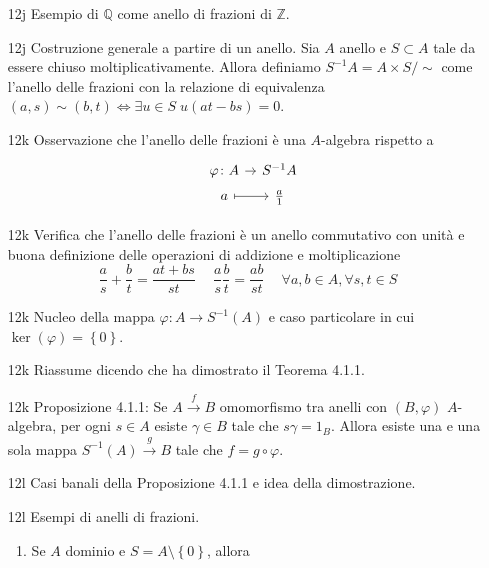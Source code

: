 \documentclass[italian]{article}
\begin{document}
	\begin{enumerate}
      \item[12j] Esempio di $\mathbb{Q}$ come anello di frazioni di
        $\mathbb{Z}$. 
      \item[12j] Costruzione generale a partire di un anello. Sia $A$ anello
        e $S\subset A$ tale da essere chiuso moltiplicativamente. Allora
        definiamo $S^{-1} A = A \times S / \sim$ come l'anello delle frazioni
        con la relazione di equivalenza $(a,s) \sim (b,t) \iff \exists u \in S\;
        u(at - bs) = 0$. 
      \item[12k] Osservazione che l'anello delle frazioni è una $A$-algebra
        rispetto a 
        \begin{equation*}
        	\begin{tikzcd}[row sep=0.2em, column sep = 0.8em]
        		&\varphi \colon A \arrow{r}  & S^{-1}A \\
         		&		a \arrow[r, mapsto] & \frac{a}{1}	
        	\end{tikzcd}
        \end{equation*}
      \item[12k] Verifica che l'anello delle frazioni è un anello commutativo
        con unità e buona definizione delle operazioni di addizione e moltiplicazione
        \begin{equation*}
        	\frac{a}{s} + \frac{b}{t} = \frac{at+bs}{st} \quad\ 
        		\frac{a}{s}\frac{b}{t} = \frac{ab}{st} \quad\
        		\forall a,b \in A, \forall s,t \in S
        \end{equation*}
      \item[12k] Nucleo della mappa $\varphi \colon A \to S^{-1}(A)$ e caso
        particolare in cui $\ker(\varphi) = \left\{ 0 \right\}$.
      \item[12k] Riassume dicendo che ha dimostrato il Teorema 4.1.1\cite{vergura}.
      \item[12k] Proposizione 4.1.1\cite{vergura}: Se $A \xrightarrow{f} B$ omomorfismo 
        tra anelli con $(B, \varphi)$ $A$-algebra, per ogni $s \in A$ esiste $\gamma \in B$ 
        tale che $s\gamma = 1_B$. Allora esiste una e una sola mappa 
        $S^{-1}(A) \xrightarrow{g} B$ tale che $f = g \circ \varphi$.
      \item[12l] Casi banali della Proposizione 4.1.1 \cite{vergura}
        e idea della dimostrazione.
      \item[12l] Esempi di anelli di frazioni.
        \begin{enumerate}
          \item Se $A$ dominio e $S = A \setminus \left\{ 0 \right\}$, allora

\end{enumerate}
\end{enumerate}
\end{document}
